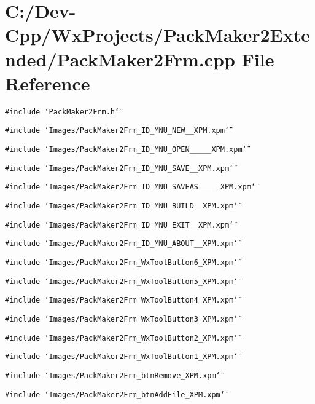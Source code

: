 \section{C:/Dev-Cpp/Wx\-Projects/Pack\-Maker2Extended/Pack\-Maker2Frm.cpp File Reference}
\label{_pack_maker2_frm_8cpp}
{\tt \#include \char`\"{}Pack\-Maker2Frm.h\char`\"{}}\par
{\tt \#include \char`\"{}Images/Pack\-Maker2Frm\_\-ID\_\-MNU\_\-NEW\_\_\-XPM.xpm\char`\"{}}\par
{\tt \#include \char`\"{}Images/Pack\-Maker2Frm\_\-ID\_\-MNU\_\-OPEN\_\-\_\-\_\-\_\_\-XPM.xpm\char`\"{}}\par
{\tt \#include \char`\"{}Images/Pack\-Maker2Frm\_\-ID\_\-MNU\_\-SAVE\_\_\-XPM.xpm\char`\"{}}\par
{\tt \#include \char`\"{}Images/Pack\-Maker2Frm\_\-ID\_\-MNU\_\-SAVEAS\_\-\_\-\_\-\_\_\-XPM.xpm\char`\"{}}\par
{\tt \#include \char`\"{}Images/Pack\-Maker2Frm\_\-ID\_\-MNU\_\-BUILD\_\_\-XPM.xpm\char`\"{}}\par
{\tt \#include \char`\"{}Images/Pack\-Maker2Frm\_\-ID\_\-MNU\_\-EXIT\_\_\-XPM.xpm\char`\"{}}\par
{\tt \#include \char`\"{}Images/Pack\-Maker2Frm\_\-ID\_\-MNU\_\-ABOUT\_\_\-XPM.xpm\char`\"{}}\par
{\tt \#include \char`\"{}Images/Pack\-Maker2Frm\_\-Wx\-Tool\-Button6\_\-XPM.xpm\char`\"{}}\par
{\tt \#include \char`\"{}Images/Pack\-Maker2Frm\_\-Wx\-Tool\-Button5\_\-XPM.xpm\char`\"{}}\par
{\tt \#include \char`\"{}Images/Pack\-Maker2Frm\_\-Wx\-Tool\-Button4\_\-XPM.xpm\char`\"{}}\par
{\tt \#include \char`\"{}Images/Pack\-Maker2Frm\_\-Wx\-Tool\-Button3\_\-XPM.xpm\char`\"{}}\par
{\tt \#include \char`\"{}Images/Pack\-Maker2Frm\_\-Wx\-Tool\-Button2\_\-XPM.xpm\char`\"{}}\par
{\tt \#include \char`\"{}Images/Pack\-Maker2Frm\_\-Wx\-Tool\-Button1\_\-XPM.xpm\char`\"{}}\par
{\tt \#include \char`\"{}Images/Pack\-Maker2Frm\_\-btn\-Remove\_\-XPM.xpm\char`\"{}}\par
{\tt \#include \char`\"{}Images/Pack\-Maker2Frm\_\-btn\-Add\-File\_\-XPM.xpm\char`\"{}}\par
